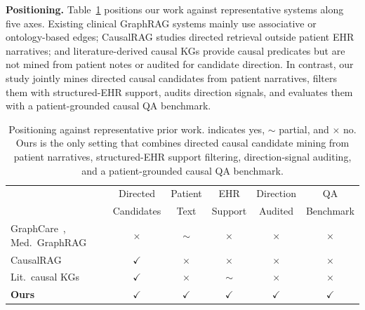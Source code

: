 \documentclass[runningheads]{llncs}
\begin{document}
\noindent\textbf{Positioning.} Table~\ref{tab:position} positions our work against representative systems along five axes. Existing clinical GraphRAG systems mainly use associative or ontology-based edges; CausalRAG studies directed retrieval outside patient EHR narratives; and literature-derived causal KGs provide causal predicates but are not mined from patient notes or audited for candidate direction. In contrast, our study jointly mines directed causal candidates from patient narratives, filters them with structured-EHR support, audits direction signals, and evaluates them with a patient-grounded causal QA benchmark.%

\begin{table}[!htbp]
\centering
\caption{Positioning against representative prior work. \checkmark{} indicates yes, $\sim$ partial, and $\times$ no. Ours is the only setting that combines directed causal candidate mining from patient narratives, structured-EHR support filtering, direction-signal auditing, and a patient-grounded causal QA benchmark.}
\vspace{-0.2cm}
\label{tab:position}
\setlength{\tabcolsep}{2pt}\footnotesize
\resizebox{\textwidth}{!}
{%
\begin{tabular}{lccccc}\toprule
 & Directed & Patient & EHR & Direction & QA \\
 & Candidates & Text & Support & Audited & Benchmark \\\midrule
GraphCare~\cite{jiang2024graphcare}, Med.\ GraphRAG~\cite{medgraphrag2024} & $\times$ & $\sim$ & $\times$ & $\times$ & $\times$ \\
CausalRAG~\cite{wang2025causalrag} & $\checkmark$ & $\times$ & $\times$ & $\times$ & $\times$ \\
Lit.\ causal KGs~\cite{kilicoglu2012semmeddb,nordon2019building,lyu2023dnkg,ade2026causalkg} & $\checkmark$ & $\times$ & $\sim$ & $\times$ & $\times$ \\
\textbf{Ours} & $\checkmark$ & $\checkmark$ & $\checkmark$ & $\checkmark$ & $\checkmark$ \\\bottomrule
\end{tabular}}
\vspace{-0.3cm}
\end{table}
\end{document}
